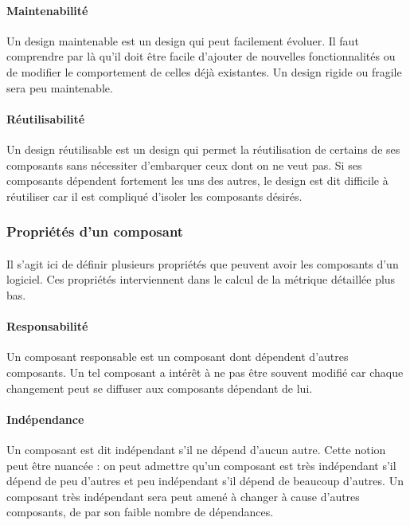 \documentclass{scrartcl}
\begin{document}
    \paragraph{Maintenabilité}Un design maintenable est un design qui peut facilement évoluer. Il faut comprendre par là qu'il doit être facile d'ajouter de nouvelles fonctionnalités ou de modifier le comportement de celles déjà existantes. Un design rigide ou fragile sera peu maintenable.

    \paragraph{Réutilisabilité}Un design réutilisable est un design qui permet la réutilisation de certains de ses composants sans nécessiter d'embarquer ceux dont on ne veut pas. Si ses composants dépendent fortement les uns des autres, le design est dit difficile à réutiliser car il est compliqué d'isoler les composants désirés.
    
\subsubsection{Propriétés d'un composant}
\label{componentProperties}

    \paragraph{}Il s'agit ici de définir plusieurs propriétés que peuvent avoir les composants d'un logiciel. Ces propriétés interviennent dans le calcul de la métrique détaillée plus bas.
    
    \paragraph{Responsabilité}Un composant responsable est un composant dont dépendent d'autres composants. Un tel composant a intérêt à ne pas être souvent modifié car chaque changement peut se diffuser aux composants dépendant de lui.
    
    \paragraph{Indépendance}Un composant est dit indépendant s'il ne dépend d'aucun autre. Cette notion peut être nuancée : on peut admettre qu'un composant est très indépendant s'il dépend de peu d'autres et peu indépendant s'il dépend de beaucoup d'autres. Un composant très indépendant sera peut amené à changer à cause d'autres composants, de par son faible nombre de dépendances.
    
\end{document}
